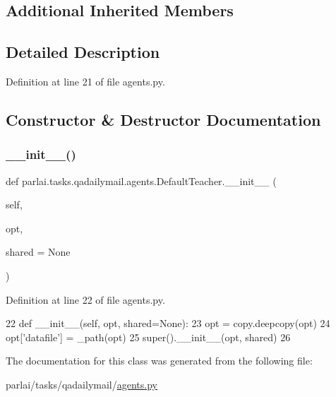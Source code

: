 \subsection*{Additional Inherited Members}


\subsection{Detailed Description}


Definition at line 21 of file agents.\+py.



\subsection{Constructor \& Destructor Documentation}
\mbox{\label{classparlai_1_1tasks_1_1qadailymail_1_1agents_1_1DefaultTeacher_a9b9a49fa6e1a61092205f2500fe4f933}} 
\subsubsection{\texorpdfstring{\+\_\+\+\_\+init\+\_\+\+\_\+()}{\_\_init\_\_()}}
{\footnotesize\ttfamily def parlai.\+tasks.\+qadailymail.\+agents.\+Default\+Teacher.\+\_\+\+\_\+init\+\_\+\+\_\+ (\begin{DoxyParamCaption}\item[{}]{self,  }\item[{}]{opt,  }\item[{}]{shared = {\ttfamily None} }\end{DoxyParamCaption})}



Definition at line 22 of file agents.\+py.


\begin{DoxyCode}
22     \textcolor{keyword}{def }\_\_init\_\_(self, opt, shared=None):
23         opt = copy.deepcopy(opt)
24         opt[\textcolor{stringliteral}{'datafile'}] = \_path(opt)
25         super().\_\_init\_\_(opt, shared)
26 \end{DoxyCode}


The documentation for this class was generated from the following file\+:\begin{DoxyCompactItemize}
\item 
parlai/tasks/qadailymail/\hyperlink{parlai_2tasks_2qadailymail_2agents_8py}{agents.\+py}\end{DoxyCompactItemize}
